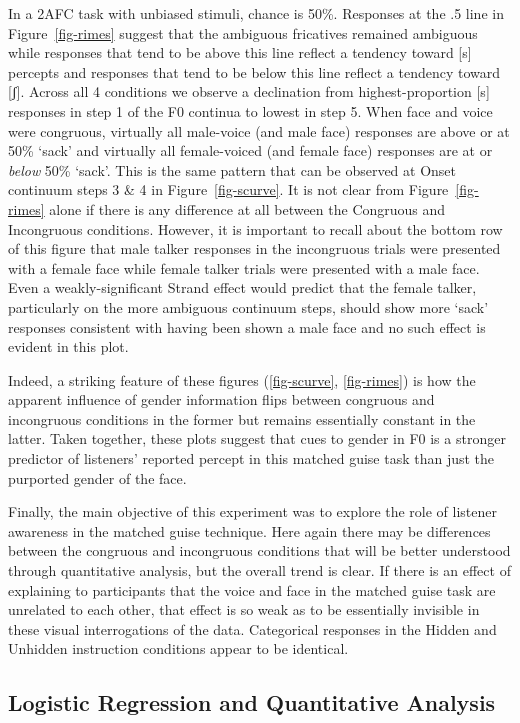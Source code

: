 \documentclass[
  letterpaper,
  DIV=11,
  numbers=noendperiod]{scrartcl}
\begin{document}
In a 2AFC task with unbiased stimuli, chance is 50\%. Responses at the
.5 line in Figure~\ref{fig-rimes} suggest that the ambiguous fricatives
remained ambiguous while responses that tend to be above this line
reflect a tendency toward {[}s{]} percepts and responses that tend to be
below this line reflect a tendency toward {[}ʃ{]}. Across all 4
conditions we observe a declination from highest-proportion {[}s{]}
responses in step 1 of the F0 continua to lowest in step 5. When face
and voice were congruous, virtually all male-voice (and male face)
responses are above or at 50\% `sack' and virtually all female-voiced
(and female face) responses are at or \emph{below} 50\% `sack'. This is
the same pattern that can be observed at Onset continuum steps 3 \& 4 in
Figure~\ref{fig-scurve}. It is not clear from Figure~\ref{fig-rimes}
alone if there is any difference at all between the Congruous and
Incongruous conditions. However, it is important to recall about the
bottom row of this figure that male talker responses in the incongruous
trials were presented with a female face while female talker trials were
presented with a male face. Even a weakly-significant Strand effect
would predict that the female talker, particularly on the more ambiguous
continuum steps, should show more `sack' responses consistent with
having been shown a male face and no such effect is evident in this
plot.

Indeed, a striking feature of these figures
(\ref{fig-scurve}, \ref{fig-rimes}) is how the apparent influence of
gender information flips between congruous and incongruous conditions in
the former but remains essentially constant in the latter. Taken
together, these plots suggest that cues to gender in F0 is a stronger
predictor of listeners' reported percept in this matched guise task than
just the purported gender of the face.

Finally, the main objective of this experiment was to explore the role
of listener awareness in the matched guise technique. Here again there
may be differences between the congruous and incongruous conditions that
will be better understood through quantitative analysis, but the overall
trend is clear. If there is an effect of explaining to participants that
the voice and face in the matched guise task are unrelated to each
other, that effect is so weak as to be essentially invisible in these
visual interrogations of the data. Categorical responses in the Hidden
and Unhidden instruction conditions appear to be identical.

\subsection{Logistic Regression and Quantitative
Analysis}\label{sub-results-stats}
\end{document}
